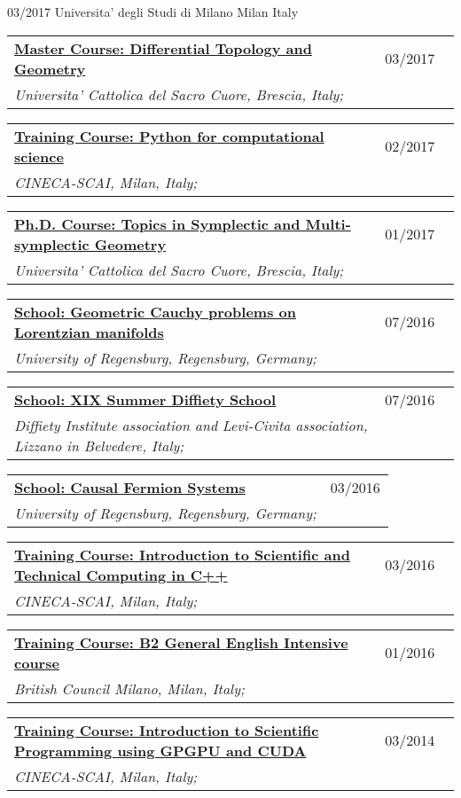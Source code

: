 \documentclass[a4paper]{article}
\newcommand{\longvoice}[8]{
	\begin{tabular}{p{0.83\linewidth} p{0.17\linewidth} }
		\textbf{\href{#3}{#2: #1}} & #4 
		\\ 
		\textit{#5, #6, #7;} & {\small\emph{#8}}
	\end{tabular}
	\vspace{.5em}
}
\begin{document}
		{03/2017}
		{Universita' degli Studi di Milano}
		{Milan}
		{Italy}
		{}
	\longvoice{Differential Topology and Geometry}
		{Master Course}
		{http://docenti.unicatt.it/web/html/index.html\#/programmi/BS/2D8B/75017/2017/21065/MGH344/ita}
		{03/2017}
		{Universita' Cattolica del Sacro Cuore}
		{Brescia}
		{Italy}
		{}
	\longvoice{Python for computational science}
		{Training Course}
		{https://web.archive.org/web/20170623170252/https://eventi.cineca.it/en/hpc/python-computational-science}
		{02/2017}
		{CINECA-SCAI}
		{Milan}
		{Italy}
		{}
	\longvoice{Topics in Symplectic and Multi-symplectic Geometry}
		{Ph.D. Course}
		{https://web.archive.org/save/http://scuoledidottorato.unicatt.it/phdschools/science-10545.html}
		{01/2017}
		{Universita' Cattolica del Sacro Cuore}
		{Brescia}
		{Italy}
		{}
	\longvoice{Geometric Cauchy problems on Lorentzian manifolds}
		{School}
		{https://web.archive.org/web/20170623170457/http://www-app.uni-regensburg.de/Fakultaeten/MAT/GK/index.php/Summer_School_2016}
		{07/2016}
		{University of Regensburg}
		{Regensburg}
		{Germany}
		{}
	\longvoice{XIX Summer Diffiety School}
		{School}
		{https://web.archive.org/web/20170623170547/https://sites.google.com/site/levicivitainstitute//Activities/DiffietySchools/xix-summer-diffiety-school}
		{07/2016}
		{Diffiety Institute association and Levi-Civita association}
		{Lizzano in Belvedere}
		{Italy}
		{}
	\longvoice{Causal Fermion Systems}
		{School}
		{https://web.archive.org/web/20170623170718/http://www.uni-regensburg.de/mathematics/causal-fermion-systems/}
		{03/2016}
		{University of Regensburg}
		{Regensburg}
		{Germany}
		{}
	\longvoice{Introduction to Scientific and Technical Computing in C++}
		{Training Course}
		{https://web.archive.org/save/http://www.hpc.cineca.it/content/introduction-object-oriented}
		{03/2016}
		{CINECA-SCAI}
		{Milan}
		{Italy}
		{}
	\longvoice{B2 General English Intensive course}
		{Training Course}
		{https://www.britishcouncil.it/en/english/courses-adults/general}
		{01/2016}
		{British Council Milano}
		{Milan}
		{Italy}
		{}
	\longvoice{Introduction to Scientific Programming using GPGPU and CUDA}
		{Training Course}
		{https://web.archive.org/web/20170623171128/http://www.hpc.cineca.it/content/introduction-to-gpu}
		{03/2014}
		{CINECA-SCAI}
		{Milan}
		{Italy}
		{}
\end{document}
